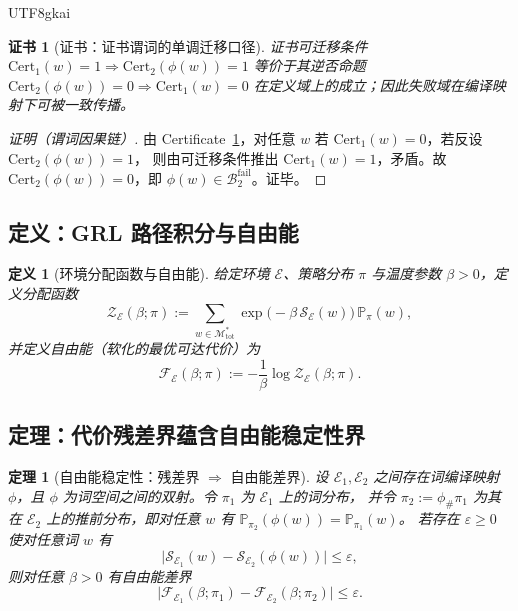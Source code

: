 \documentclass[12pt]{article}
\newtheorem{definition}{定义}[section]
\newtheorem{theorem}{定理}[section]
\newtheorem{certificate}{证书}[section]
\begin{document}
\begin{CJK*}{UTF8}{gkai}
\begin{certificate}[证书：证书谓词的单调迁移口径]
\label{cert:cert-monotone-transfer}
证书可迁移条件 $\mathrm{Cert}_1(w)=1\Rightarrow \mathrm{Cert}_2(\phi(w))=1$ 等价于其逆否命题 $\mathrm{Cert}_2(\phi(w))=0\Rightarrow
  \mathrm{Cert}_1(w)=0$ 在定义域上的成立；因此失败域在编译映射下可被一致传播。
\end{certificate}

\begin{proof}[证明（谓词因果链）]
由 Certificate~\ref{cert:cert-monotone-transfer}，对任意 $w$ 若 $\mathrm{Cert}_1(w)=0$，若反设 $\mathrm{Cert}_2(\phi(w))=1$，
  则由可迁移条件推出 $\mathrm{Cert}_1(w)=1$，矛盾。故 $\mathrm{Cert}_2(\phi(w))=0$，即 $\phi(w)\in \mathcal{B}_2^{\mathrm{fail}}$。证毕。
\end{proof}

\subsection{定义：GRL 路径积分与自由能}

\begin{definition}[环境分配函数与自由能]
\label{def:env-free-energy}
给定环境 $\mathcal{E}$、策略分布 $\pi$ 与温度参数 $\beta>0$，定义分配函数
\[
\mathcal{Z}_{\mathcal{E}}(\beta;\pi)
:=
\sum_{w\in \mathcal{M}_{\mathrm{tot}}^{\ast}}
\exp\!\bigl(-\beta\,\mathcal{S}_{\mathcal{E}}(w)\bigr)\,\mathbb{P}_{\pi}(w),
\]
并定义自由能（软化的最优可达代价）为
\[
\mathcal{F}_{\mathcal{E}}(\beta;\pi)
:=
-\frac{1}{\beta}\log \mathcal{Z}_{\mathcal{E}}(\beta;\pi).
\]
\end{definition}

\subsection{定理：代价残差界蕴含自由能稳定性界}

\begin{theorem}[自由能稳定性：残差界 $\Rightarrow$ 自由能差界]
\label{thm:free-energy-stability}
设 $\mathcal{E}_1,\mathcal{E}_2$ 之间存在词编译映射 $\phi$，且 $\phi$ 为词空间之间的双射。令 $\pi_1$ 为 $\mathcal{E}_1$ 上的词分布，
并令 $\pi_2:=\phi_{\#}\pi_1$ 为其在 $\mathcal{E}_2$ 上的推前分布，即对任意 $w$ 有 $\mathbb{P}_{\pi_2}(\phi(w))=\mathbb{P}_{\pi_1}(w)$。
若存在 $\varepsilon\ge 0$ 使对任意词 $w$ 有
\[
\bigl|\mathcal{S}_{\mathcal{E}_1}(w)-\mathcal{S}_{\mathcal{E}_2}(\phi(w))\bigr|\le \varepsilon,
\]
则对任意 $\beta>0$ 有自由能差界
\[
\bigl|\mathcal{F}_{\mathcal{E}_1}(\beta;\pi_1)-\mathcal{F}_{\mathcal{E}_2}(\beta;\pi_2)\bigr|\le \varepsilon.
\]
\end{theorem}


\end{CJK*}
\end{document}

